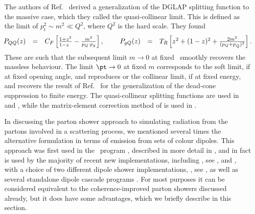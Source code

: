 The authors of Ref.~\cite{Catani:2002hc} derived a generalization of the DGLAP splitting
function to the massive case, which they called the quasi-collinear
limit.  This is defined as the limit of $p_t^2\sim m^2\ll Q^2$, where
$Q^2$ is the hard scale.  They found
\begin{equation}
  \hspace*{-1cm}
  \begin{array}{rcl@{\hspace*{2.5em}}rcl}
    P_{QQ}(z) &=& C_F\left[\frac{1+z^2}{1-z\phantom{^2}}-\frac{m^2}{p_Q\cdot p_g}\right], &
    P_{gQ}(z) &=& T_R\left[z^2+(1-z)^2+\frac{2m^2}{(p_Q+p_{\bar{Q}})^2}\right].
  \end{array}
  \hspace*{-1cm}
\end{equation}
These are such that the subsequent limit $m\to0$ at fixed \pt\ smoothly
recovers the massless behaviour.  The limit $\pt\to0$ at fixed $m$
corresponds to the soft limit, if at fixed opening angle, and reproduces
 or the collinear limit, if at fixed energy, and
recovers the result of Ref.~\cite{Norrbin:2000uu} for the generalization of
the dead-cone suppression to finite energy.  The quasi-collinear
splitting functions are used in \Herwigpp and \Sherpa, while the
matrix-element correction method of \cite{Norrbin:2000uu} is used in
\pythiaeight.

\label{sec:dipoles}
In discussing the parton shower approach to simulating radiation from
the partons involved in a scattering process, we mentioned several times
the alternative formulation in terms of emission from sets of colour
dipoles.  This approach was first used in the \Ariadne\ program
\cite{Gustafson:1987rq}, described in more detail in
, and in fact is used by the majority of recent new
implementations, including \pythiaeight \cite{Sjostrand:2004ef}, see
, and \sherpa, with a choice of two different dipole
shower implementations, \cite{Winter:2007ye,Schumann:2007mg}, see
, as well as several standalone dipole cascade programs
\cite{Giele:2007di,Nagy:2007ty,Dinsdale:2007mf}.  For most
purposes it can be considered equivalent to the coherence-improved
parton showers discussed already, but it does have some advantages,
which we briefly describe in this section.

